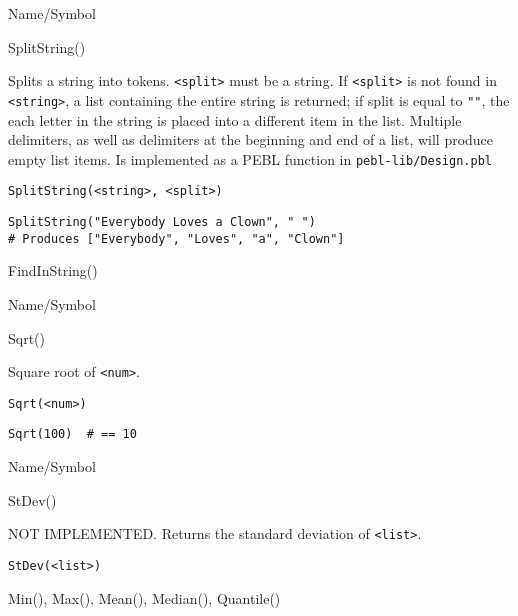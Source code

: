 \begin{desc}{Name/Symbol}
\item[Name/Symbol]  	SplitString()

\item[Description]	Splits a string into tokens. \verb+<split>+ must be a string. If 
		\verb+<split>+ is not found in \verb+<string>+, a list containing the entire 
		string is returned; if split is equal to \verb+""+, the each letter 
		in the string is placed into a different item in the list.  
		Multiple delimiters, as well as delimiters at the beginning 
		and end of a list, will produce empty list items. 
		Is implemented as a PEBL function in \texttt{pebl-lib/Design.pbl}

\item[Usage]
\begin{verbatim}
SplitString(<string>, <split>)
\end{verbatim}

\item[Example]      	
\begin{verbatim}
SplitString("Everybody Loves a Clown", " ") 
# Produces ["Everybody", "Loves", "a", "Clown"]
\end{verbatim}

\item[See Also]     	FindInString()
\end{desc}

\rl


\begin{desc}{Name/Symbol}
\item[Name/Symbol]  	Sqrt() 

\item[Description]  	Square root of \verb+<num>+.

\item[Usage]        	
\begin{verbatim}
Sqrt(<num>)
\end{verbatim}

\item[Example]
\begin{verbatim}
Sqrt(100)  # == 10
\end{verbatim}

\item[See Also]	
\end{desc}

\rl


\begin{desc}{Name/Symbol}
\item[Name/Symbol]  	StDev() 

\item[Description] 	NOT IMPLEMENTED. Returns the standard deviation of \verb+<list>+.

\item[Usage]       	
\begin{verbatim}
StDev(<list>)        
\end{verbatim}

\item[Example]	

\item[See Also]     	Min(), Max(), Mean(), Median(), Quantile()
\end{desc}

